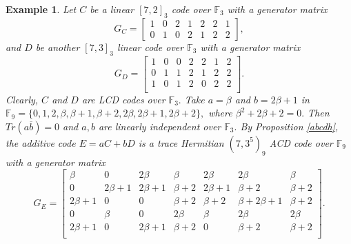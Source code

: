 \documentclass[sn-mathphys-num]{sn-jnl}%
\theoremstyle{thmstyleone}%
\theoremstyle{thmstyletwo}%
\newtheorem{example}{Example}%
\theoremstyle{thmstylethree}%
\begin{document}
\begin{example}
	Let $C$  be a linear $[7,2]_3$ code over $\mathbb{F}_{3}$ with a generator matrix 
	$$G_C=\begin{bmatrix}
		1& 0& 2&1& 2& 2& 1\\
		0& 1& 0& 2& 1& 2& 2
	\end{bmatrix},$$
	and $D$ be another $[7,3]_3$ linear code over $\mathbb{F}_{3}$ with a generator matrix $$ G_D=\begin{bmatrix}
		1& 0& 0& 2& 2& 1& 2\\
		0 &1& 1& 2& 1& 2& 2\\
		1 &0& 1 &2& 0 &2 &2\\
	\end{bmatrix}.$$
	Clearly, $C$ and $D$ are LCD codes over  $\mathbb{F}_{3}.$ Take $a=\beta$ and $b=2\beta+1$ in $\mathbb{F}_{9}=\{0,1,2,\beta,\beta +1,\beta +2,2\beta,2\beta +1,2\beta+2\},$ where $\beta^2+2\beta+2=0.$ Then $ Tr(a\overline{b})=0$ and $a,b$ are linearly independent over $\mathbb{F}_3.$   By Proposition \ref{abcdh}, the additive code $E=aC+bD$ is a trace Hermitian $(7,3^5)_{9}$ ACD code over $\mathbb{F}_{9}$ with a generator matrix  
	$$ G_E=\begin{bmatrix}
		\beta& 0& 2\beta&\beta& 2\beta& 2\beta& \beta\\
		0 &2\beta+1& 2\beta+1& \beta+2& 2\beta+1& \beta+2& \beta+2\\
		2\beta+1& 0& 0& \beta+2& \beta+2& \beta+2\beta+1& \beta+2\\
		0& \beta& 0& 2\beta& \beta& 2\beta& 2\beta\\
		2\beta+1 &0& 2\beta+1 &\beta+2& 0 &\beta+2 &\beta+2\\
	\end{bmatrix}.$$
	
\end{example}
\end{document}
